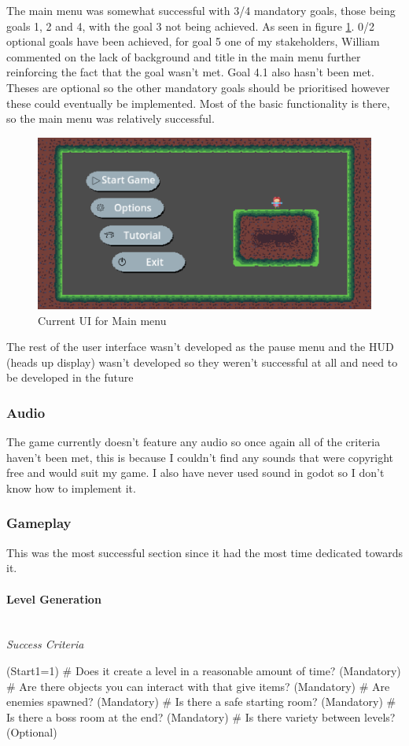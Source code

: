 \documentclass{article}
\newcommand{\parBr}{\vspace{5mm}}%
\newcommand{\myparagraph}[1]{\paragraph{#1}\mbox{}\\} %
\newcommand{\smallBr}{\vspace{1.5mm}}
\begin{document}
\parBr

The main menu was somewhat successful with 3/4 mandatory goals, those being goals 1, 2 and 4, with the goal 3 not being achieved. As seen in figure \ref{main menu}. 0/2 optional goals have been achieved, for goal 5 one of my stakeholders, William commented on the lack of background and title in the main menu further reinforcing the fact that the goal wasn't met. Goal 4.1 also hasn't been met. Theses are optional so the other mandatory goals should be prioritised however these could eventually be implemented. Most of the basic functionality is there, so the main menu was relatively successful.

\begin{figure}[H]
\centering
\includegraphics[width = 0.6\linewidth]{main menu}
\caption{Current UI for Main menu}
\label{main menu}
\end{figure}

The rest of the user interface wasn't developed as the pause menu and the HUD (heads up display) wasn't developed so they weren't successful at all and need to be developed in the future

\subsubsection{Audio}
The game currently doesn't feature any audio so once again all of the criteria haven't been met, this is because I couldn't find any sounds that were copyright free and would suit my game.  I also have never used sound in godot so I don't know how to implement it.

\subsubsection{Gameplay}
This was the most successful section since it had the most time dedicated towards it.

\myparagraph{Level Generation} \smallBr
\textit{Success Criteria}
\begin{easylist}
\ListProperties(Start1=1)
# Does it create a level in a reasonable amount of time? (Mandatory)
# Are there objects you can interact with that give items? (Mandatory)
# Are enemies spawned? (Mandatory)
# Is there a safe starting room? (Mandatory)
# Is there a boss room at the end? (Mandatory)
# Is there variety between levels? (Optional)
\end{easylist}
\end{document}

